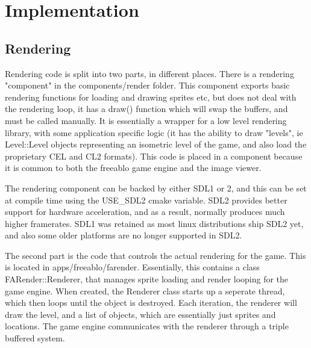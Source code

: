 \chapter{Implementation}

 \section{Rendering}  
    Rendering code is split into two parts, in different places. There is a rendering "component" in the components/render folder.
    This component exports basic rendering functions for loading and drawing sprites etc, but does not deal with the rendering loop, it has a draw() function which will swap the buffers, and must be called manually.   
    It is essentially a wrapper for a low level rendering library, with some application specific logic (it has the ability to draw "levels", ie Level::Level objects representing an isometric level of the game, and also load the proprietary CEL and CL2 formats).
    This code is placed in a component because it is common to both the freeablo game engine and the image viewer.
    
    The rendering component can be backed by either SDL1 or 2, and this can be set at compile time using the USE\_SDL2 cmake variable. SDL2 provides better support for hardware acceleration, and as a result, normally produces much higher framerates. SDL1 was retained as most linux distributions ship SDL2 yet, and also some older platforms are no longer supported in SDL2.
    
    \mbox{}
    
    The second part is the code that controls the actual rendering for the game. This is located in apps/freeablo/farender. Essentially, this contains a class FARender::Renderer, that manages sprite loading and render looping for the game engine.  
    When created, the Renderer class starts up a seperate thread, which then loops until the object is destroyed. Each iteration, the renderer will draw the level, and a list of objects, which are essentially just sprites and locations.
    The game engine communicates with the renderer through a triple buffered system.
    
